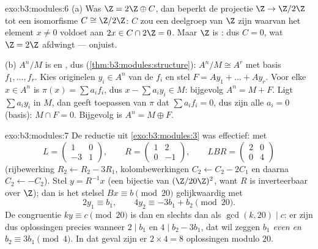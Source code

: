 \begin{solution}{exo:b3:modules:6}
(a) Was $\Z = 2\Z \oplus C$, dan beperkt de projectie $\Z \to
\Z/2\Z$ tot een isomorfisme $C \cong \Z/2\Z$: $C$ zou een
deelgroep van $\Z$ zijn waarvan het element $x \neq 0$ voldoet aan
$2x \in C \cap 2\Z = 0$. Maar $\Z$ is : dus $C = 0$, wat
$\Z = 2\Z$ afdwingt --- onjuist.

(b) $A^n/M$ is  en , dus 
(\cref{thm:b3:modules:structure}): $A^n/M \cong A^r$ met basis
$f_1, \dots, f_r$. Kies originelen $y_i \in A^n$ van de $f_i$ en
stel $F = Ay_1 + \dots + Ay_r$. Voor elke $x \in A^n$ is $\pi(x) =
\sum a_if_i$, dus $x - \sum a_iy_i \in M$: bijgevolg $A^n = M + F$.
Ligt $\sum a_iy_i$ in $M$, dan geeft toepassen van $\pi$ dat $\sum
a_if_i = 0$, dus zijn alle $a_i = 0$ (basis): $M \cap F = 0$.
Bijgevolg is $A^n = M \oplus F$.
\end{solution}

\begin{solution}{exo:b3:modules:7}
De reductie uit \cref{exo:b3:modules:3} was effectief: met
\[
L = \begin{pmatrix} 1 & 0\\ -3 & 1\end{pmatrix},
\qquad
R = \begin{pmatrix} 1 & 2\\ 0 & -1 \end{pmatrix},
\qquad
LBR = \begin{pmatrix} 2 & 0\\ 0 & 4\end{pmatrix}
\]
(rijbewerking $R_2 \leftarrow R_2 - 3R_1$, kolombewerkingen $C_2
\leftarrow C_2 - 2C_1$ en daarna $C_2 \leftarrow -C_2$). Stel $y =
R^{-1}x$ (een bijectie van $(\Z/20\Z)^2$, want $R$ is
inverteerbaar over $\Z$); dan is het stelsel $Bx \equiv b
\pmod{20}$ gelijkwaardig met
\[
2y_1 \equiv b_1, \qquad 4y_2 \equiv -3b_1 + b_2 \pmod{20}.
\]
De congruentie $ky \equiv c \pmod{20}$ is  dan en slechts
dan als $\gcd(k, 20) \mid c$: er zijn dus oplossingen precies
wanneer $2 \mid b_1$ en $4 \mid b_2 - 3b_1$, dat wil zeggen
\emph{$b_1$ even en $b_2 \equiv 3b_1 \pmod 4$}. In dat geval zijn
er $2 \times 4 = 8$ oplossingen modulo $20$.
\end{solution}

